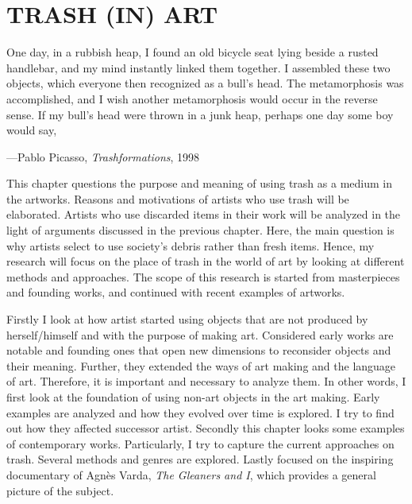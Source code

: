 \chapter{TRASH (IN) ART}



\begin{singlespace}
\epigraph{One day, in a rubbish heap, I found an old bicycle seat lying beside a rusted handlebar, and my mind instantly linked them together. I assembled these two objects, which everyone then recognized as a bull’s head. The metamorphosis was accomplished, and I wish another metamorphosis would occur in the reverse sense. If my bull’s head were thrown in a junk heap, perhaps one day some boy would say, }{\hfill ---Pablo Picasso, \textit{Trashformations}, 1998}
\end{singlespace}



This chapter questions the purpose and meaning of using trash as a medium in the artworks. Reasons and motivations of artists who use trash will be elaborated. Artists who use discarded items in their work will be analyzed in the light of arguments discussed in the previous chapter. Here, the main question is why artists select to use society’s debris rather than fresh items. Hence, my research will focus on the place of trash in the world of art by looking at different methods and approaches. The scope of this research is started from masterpieces and founding works, and continued with recent examples of artworks.

Firstly I look at how artist started using objects that are not produced by herself/himself and with the purpose of making art. Considered early works are notable and founding ones that open new dimensions to reconsider objects and their meaning. Further, they extended the ways of art making and the language of art. Therefore, it is important and necessary to analyze them. In other words, I first look at the foundation of using non-art objects in the art making. Early examples are analyzed and how they evolved over time is explored. I try to find out how they affected successor artist. Secondly this chapter looks some examples of contemporary works. Particularly, I try to capture the current approaches on trash. Several methods and genres are explored. Lastly focused on the inspiring documentary of Agnès Varda, \textit{The Gleaners and I}, which provides a general picture of the subject.



